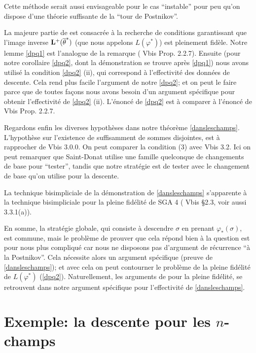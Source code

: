 \documentclass[12pt]{article}
\newcommand{\numero}[1]{\newpage\section{#1}}
\begin{document}
Cette m\'ethode serait aussi envisageable pour le cas ``instable''
pour peu qu'on dispose
d'une th\'eorie suffisante de la ``tour de Postnikov''.

La majeure partie de \cite{SGA4b} est consacr\'ee \`a la recherche de conditions
garantissant que
l'image inverse ${\bf L}^+(\overline{\theta}^{\ast})$ (que nous appelons
$L(\varphi ^{\ast})$) est
pleinement fid\`ele. Notre lemme \ref{dpq1} est l'analogue de la remarque
(\cite{SGA4b} Vbis Prop. 2.2.7).
Ensuite (pour notre corollaire \ref{dpq2},
dont la d\'emonstration se trouve
apr\`es \ref{dpq1})
nous avons utilis\'e la condition \ref{dpq2} (ii), qui
correspond \`a l'effectivit\'e
des donn\'ees de descente.
Cela rend plus facile l'argument de notre \ref{dpq2}; et on peut le faire
parce que de toutes fa\c{c}ons
nous avons besoin d'un argument sp\'ecifique pour obtenir l'effectivit\'e
de
\ref{dpq2} (ii). L'\'enonc\'e de \ref{dpq2} est \`a comparer \`a l'\'enonc\'e de
\cite{SGA4b} Vbis Prop. 2.2.7.

Regardons enfin les diverses hypoth\`eses dans notre th\'eor\`eme
\ref{dansleschamps}.
L'hypoth\`ese sur l'existence de suffisamment de sommes disjointes, est \`a
rapprocher de
\cite{SGA4b} Vbis 3.0.0. On peut comparer la condition (3) avec
\cite{SGA4b} Vbis 3.2.
Ici on peut remarquer que Saint-Donat utilise une famille quelconque de
changements de base pour
``tester'', tandis que notre strat\'egie est de tester avec le
changement de base qu'on
utilise pour la descente.

La technique bisimpliciale de la d\'emonstration de \ref{dansleschamps}
s'apparente \`a la
technique bisimpliciale pour la pleine fid\'elit\'e de SGA 4 (\cite{SGA4b}
Vbis \S 2.3, voir aussi
3.3.1(a)).

En somme, la strat\'egie globale, qui consiste \`a
descendre $\sigma$ en prenant
$\varphi _{\ast}(\sigma )$,
est commune, mais le probl\`eme de prouver que cela r\'epond bien \`a la
question est pour nous plus
compliqu\'e car nous ne disposons pas d'argument de r\'ecurrence
``\`a la Postnikov''. Cela n\'ecessite
alors un argument sp\'ecifique (preuve de \ref{dansleschamps}); et avec
cela on peut contourner le
probl\`eme de la pleine fid\'elit\'e de $L(\varphi ^{\ast})$ (\ref{dpq2}).
Naturellement, les
arguments de \cite{SGA4b} pour la pleine fid\'elit\'e, se retrouvent dans
notre argument
sp\'ecifique pour l'effectivit\'e de
\ref{dansleschamps}.





\numero{Exemple: la descente pour les \texorpdfstring{$n$}{n}-champs}
\end{document}
